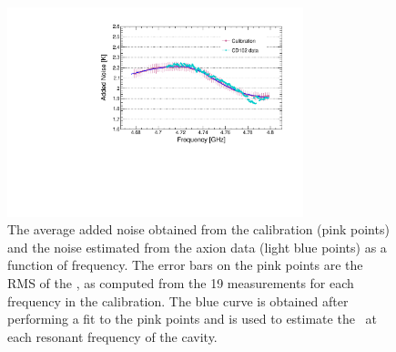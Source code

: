 \begin{figure} [htbp]
  \centering
  \includegraphics[width=8.6cm]{figures/Avg_Noise_vs_Freq_run1to19_211118.pdf}
  \caption{The average added noise obtained from the calibration (pink points)
 and the noise estimated from the axion data (light blue points) as a 
function of frequency. The error bars on the pink points are the RMS 
of the \ta, as computed from the 19 measurements for each frequency 
in the calibration. 
The blue curve is obtained after performing a fit to 
the pink points and is used to estimate the \ta\ at each resonant 
frequency of the cavity.}
  \label{fig:hemtcalvsf}
\end{figure}


  

